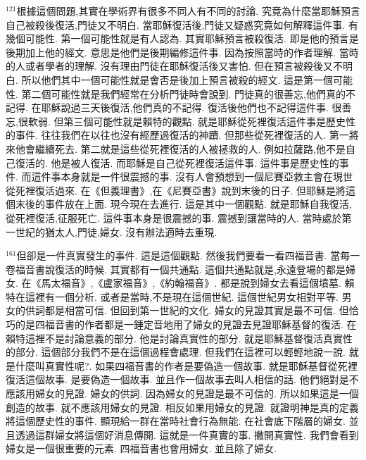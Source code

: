 \documentclass{book}
\begin{document}
$^{121}$根據這個問題,其實在學術界有很多不同人有不同的討論.
究竟為什麼當耶穌預言自己被殺後復活,門徒又不明白.
當耶穌復活後,門徒又疑惑究竟如何解釋這件事.
有幾個可能性.
第一個可能性就是有人認為.
其實耶穌預言被殺復活.
即是他的預言是後期加上他的經文.
意思是他們是後期編修這件事.
因為按照當時的作者理解.
當時的人或者學者的理解.
沒有理由門徒在耶穌復活後又害怕.
但在預言被殺後又不明白.
所以他們其中一個可能性就是會否是後加上預言被殺的經文.
這是第一個可能性.
第二個可能性就是我們經常在分析門徒時會說到.
門徒真的很善忘,他們真的不記得.
在耶穌說過三天後復活,他們真的不記得.
復活後他們也不記得這件事.
很善忘,很軟弱.
但第三個可能性就是賴特的觀點.
就是耶穌從死裡復活這件事是歷史性的事件.
往往我們在以往也沒有經歷過復活的神蹟.
但那些從死裡復活的人.
第一將來他會繼續死去.
第二就是這些從死裡復活的人被拯救的人.
例如拉薩路,他不是自己復活的.
他是被人復活.
而耶穌是自己從死裡復活這件事.
這件事是歷史性的事件.
而這件事本身就是一件很震撼的事.
沒有人會預想到一個尼賽亞救主會在現世從死裡復活過來.
在《但義理書》,在《尼賽亞書》說到末後的日子.
但耶穌是將這個末後的事件放在上面.
現今現在去進行.
這是其中一個觀點.
就是耶穌自我復活,從死裡復活,征服死亡.
這件事本身是很震撼的事.
震撼到讓當時的人.
當時處於第一世紀的猶太人,門徒,婦女.
沒有辦法適時去重現.

$^{161}$但卻是一件真實發生的事件.
這是這個觀點.
然後我們要看一看四福音書.
當每一卷福音書說復活的時候.
其實都有一個共通點.
這個共通點就是,永遠登場的都是婦女.
在《馬太福音》,《盧家福音》,《約翰福音》.
都是說到婦女去看這個墳墓.
賴特在這裡有一個分析.
或者是當時,不是現在這個世紀.
這個世紀男女相對平等.
男女的供詞都是相當可信.
但回到第一世紀的文化.
婦女的見證其實是最不可信.
但恰巧的是四福音書的作者都是一錘定音地用了婦女的見證去見證耶穌基督的復活.
在賴特這裡不是討論意義的部分.
他是討論真實性的部分.
就是耶穌基督復活真實性的部分.
這個部分我們不是在這個過程會處理.
但我們在這裡可以輕輕地說一說.
就是什麼叫真實性呢?.
如果四福音書的作者是要偽造一個故事.
就是耶穌基督從死裡復活這個故事.
是要偽造一個故事.
並且作一個故事去叫人相信的話.
他們絕對是不應該用婦女的見證.
婦女的供詞.
因為婦女的見證是最不可信的.
所以如果這是一個創造的故事.
就不應該用婦女的見證.
相反如果用婦女的見證.
就證明神是真的定義將這個歷史性的事件.
顯現給一群在當時社會行為無能.
在社會底下階層的婦女.
並且透過這群婦女將這個好消息傳開.
這就是一件真實的事.
撇開真實性.
我們會看到婦女是一個很重要的元素.
四福音書也會用婦女.
並且除了婦女.
\end{document}
